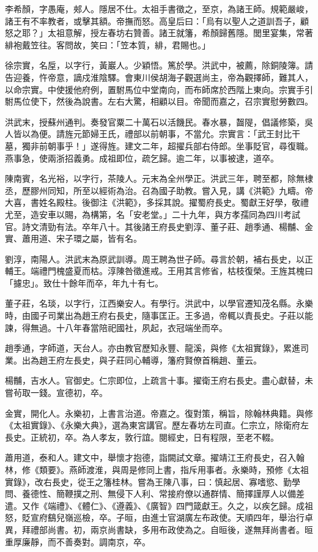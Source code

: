 \begin{pinyinscope}
李希顏，字愚庵，郟人。隱居不仕。太祖手書徵之，至京，為諸王師。規範嚴峻，諸王有不率教者，或擊其額。帝撫而怒。高皇后曰：「烏有以聖人之道訓吾子，顧怒之耶？」太祖意解，授左春坊右贊善。諸王就籓，希顏歸舊隱。閭里宴集，常著緋袍戴笠往。客問故，笑曰：「笠本質，緋，君賜也。」

徐宗實，名垕，以字行，黃巖人。少穎悟。篤於學。洪武中，被薦，除銅陵簿。請告迎養，忤帝意，謫戍淮陰驛。會東川侯胡海子觀選尚主，帝為觀擇師，難其人，以命宗實。中使援他府例，置駙馬位中堂南向，而布師席於西階上東向。宗實手引駙馬位使下，然後為說書。左右大驚，相顧以目。帝聞而嘉之，召宗實慰勞數四。

洪武末，授蘇州通判。奏發官粟二十萬石以活饑民。春水暴，齧隄，倡議修築，吳人皆以為便。請旌元節婦王氏，禮部以前朝事，不當允。宗實言：「武王封比干墓，獨非前朝事乎！」遂得旌。建文二年，超擢兵部右侍郎。坐事貶官，尋復職。燕事急，使兩浙招義勇。成祖即位，疏乞歸。逾二年，以事被逮，道卒。

陳南賓，名光裕，以字行，茶陵人。元末為全州學正。洪武三年，聘至都，除無棣丞，歷膠州同知，所至以經術為治。召為國子助教。嘗入見，講《洪範》九疇。帝大喜，書姓名殿柱。後御注《洪範》，多採其說。擢蜀府長史。蜀獻王好學，敬禮尤至，造安車以賜，為構第，名「安老堂。」二十九年，與方孝孺同為四川考試官。詩文清勁有法。卒年八十。其後諸王府長史劉淳、董子莊、趙季通、楊黼、金實、蕭用道、宋子環之屬，皆有名。

劉淳，南陽人。洪武末為原武訓導。周王聘為世子師。尋言於朝，補右長史，以正輔王。端禮門槐盛夏而枯。淳陳咎徵進戒。王用其言修省，枯枝復榮。王旌其槐曰「攄忠」。致仕十餘年而卒，年九十有七。

董子莊，名琰，以字行，江西樂安人。有學行。洪武中，以學官遷知茂名縣。永樂時，由國子司業出為趙王府右長史，隨事匡正。王多過，帝輒以責長史。子莊以能諫，得無過。十八年春當陪祀國社，夙起，衣冠端坐而卒。

趙季通，字師道，天台人。亦由教官歷知永豐、龍溪，與修《太祖實錄》，累進司業。出為趙王府左長史，與子莊同心輔導，籓府賢僚首稱趙、董云。

楊黼，吉水人。官御史。仁宗即位，上疏言十事。擢衛王府右長史。盡心獻替，未嘗茍取一錢。宣德初，卒。

金實，開化人。永樂初，上書言治道。帝嘉之。復對策，稱旨，除翰林典籍。與修《太祖實錄》、《永樂大典》，選為東宮講官。歷左春坊左司直。仁宗立，除衛府左長史。正統初，卒。為人孝友，敦行誼。閱經史，日有程限，至老不輟。

蕭用道，泰和人。建文中，舉懷才抱德，詣闕試文章。擢靖江王府長史，召入翰林，修《類要》。燕師渡淮，與周是修同上書，指斥用事者。永樂時，預修《太祖實錄》，改右長史，從王之籓桂林。嘗為王陳八事，曰：慎起居、寡嗜慾、勤學問、養德性、簡鞭撲之刑、無侵下人利、常接府僚以通群情、簡擇謹厚人以備差遣。又作《端禮》、《體仁》、《遵義》、《廣智》四門箴獻王。久之，以疾乞歸。成祖怒，貶宣府鷂兒嶺巡檢，卒。子晅，由進士官湖廣左布政使。天順四年，舉治行卓異，拜禮部尚書。初，兩京尚書缺，多用布政使為之。自晅後，遂無拜尚書者。晅重厚廉靜，而不善奏對。調南京，卒。


\end{pinyinscope}
